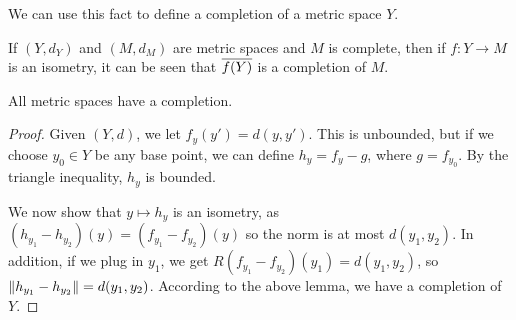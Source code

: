 We can use this fact to define a completion of a metric space $Y$.

\begin{lemma}
    If $(Y, d_Y)$ and $(M, d_M)$ are metric spaces and $M$ is complete, then if $f \colon Y \to M$ is an isometry, it can be seen that $\overline{f(Y)}$ is a completion of $M$.
\end{lemma}

\begin{theorem}
    All metric spaces have a completion.
\end{theorem}

\begin{proof}
    Given $(Y, d)$, we let $f_y(y') = d(y, y')$. This is unbounded, but if we choose $y_0 \in Y$ be any base point, we can define $h_y = f_y - g$, where $g = f_{y_0}$. By the triangle inequality, $h_y$ is bounded.

    We now show that $y \mapsto h_y$ is an isometry, as $(h_{y_1} - h_{y_2})(y) = (f_{y_1} - f_{y_2})(y)$ so the norm is at most $d(y_1, y_2)$. In addition, if we plug in $y_1$, we get $R(f_{y_1} - f_{y_2})(y_1) = d(y_1, y_2)$, so $\norm{h_{y_1} - h_{y_2}} = d(y_1, y_2)$. According to the above lemma, we have a completion of $Y$.
\end{proof}

